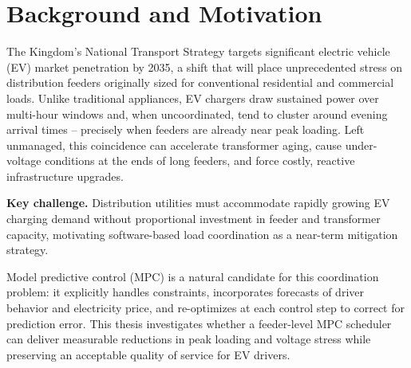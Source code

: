 \section{Background and Motivation}
The Kingdom's National Transport Strategy targets significant electric vehicle (EV) market
penetration by 2035, a shift that will place unprecedented stress on distribution feeders
originally sized for conventional residential and commercial loads. Unlike traditional
appliances, EV chargers draw sustained power over multi-hour windows and, when uncoordinated,
tend to cluster around evening arrival times -- precisely when feeders are already near peak
loading. Left unmanaged, this coincidence can accelerate transformer aging, cause under-voltage
conditions at the ends of long feeders, and force costly, reactive infrastructure upgrades.

\begin{tcolorbox}[colback=kfupmsand,colframe=kfupmgreen,boxrule=0.6pt,arc=2pt,left=8pt,right=8pt,top=6pt,bottom=6pt]
\small\textbf{Key challenge.} Distribution utilities must accommodate rapidly growing EV
charging demand without proportional investment in feeder and transformer capacity, motivating
software-based load coordination as a near-term mitigation strategy.
\end{tcolorbox}

Model predictive control (MPC) is a natural candidate for this coordination problem: it
explicitly handles constraints, incorporates forecasts of driver behavior and electricity
price, and re-optimizes at each control step to correct for prediction error. This thesis
investigates whether a feeder-level MPC scheduler can deliver measurable reductions in peak
loading and voltage stress while preserving an acceptable quality of service for EV drivers.
